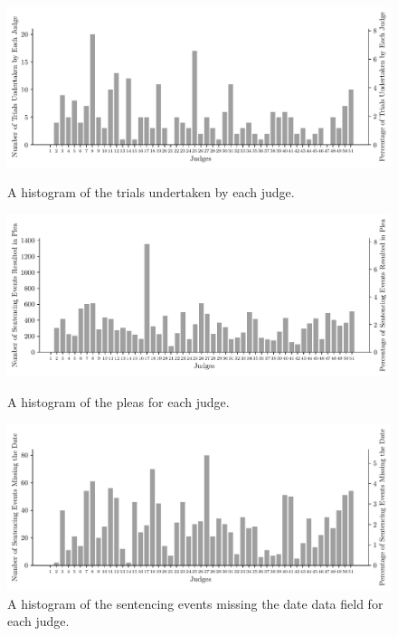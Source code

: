 \documentclass[11pt, oneside]{article}   	%
\theoremstyle{ModifiedStyle}
\begin{document}
\begin{figure}[!]
	\centering
	\begin{minipage}{\textwidth}
		\vspace{-12mm}
		\centering
		\includegraphics[scale=0.75]{Figures/Trial_Judge_Histogram}
		\vspace{-3mm}
		\caption{A histogram of the trials undertaken by each judge.}
		\label{Figure_Hester_Data_Trial_Judge_Histogram}
	\end{minipage}
	\begin{minipage}{\textwidth}
		\centering
		\includegraphics[scale=0.75]{Figures/Judge_Plea_Histogram}
		\vspace{-3mm}
		\caption{A histogram of the pleas for each judge.}
		\label{Figure_Hester_Data_Judge_Plea_Histogram}
	\end{minipage}
	\begin{minipage}{\textwidth}
		\centering
		\includegraphics[scale=0.75]{Figures/Missing_Date_Judge_Histogram}
		\vspace{-3mm}
		\caption{A histogram of the sentencing events missing the date data field for each judge.}
		\label{Figure_Hester_Data_Judge_Missing_Date_Histogram}
	\end{minipage}
\end{figure}
\end{document}
